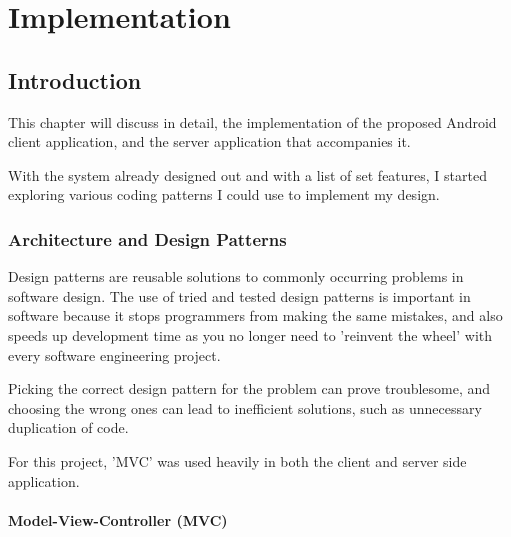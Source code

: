 
\chapter{Implementation} %

\label{Chapter5} %



\section{Introduction}

This chapter will discuss in detail, the implementation of the proposed Android client application, and the server application that accompanies it.

With the system already designed out and with a list of set features, I started exploring various coding patterns I could use to implement my design.

\subsection{Architecture and Design Patterns}

Design patterns are reusable solutions to commonly occurring problems in software design. The use of tried and tested design patterns is important in software because it stops programmers from making the same mistakes, and also speeds up development time as you no longer need to 'reinvent the wheel' with every software engineering project.

Picking the correct design pattern for the problem can prove troublesome, and choosing the wrong ones can lead to inefficient solutions, such as unnecessary duplication of code.

For this project, 'MVC' was used heavily in both the client and server side application.

\subsubsection{Model-View-Controller (MVC)}

